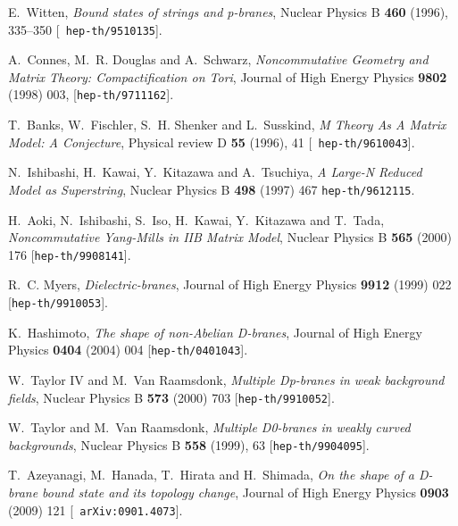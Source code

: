 \documentclass[12pt]{article}
\numberwithin{equation}{section}
\begin{document}
\providecommand{\href}[2]{#2}\begingroup\raggedright\begin{thebibliography}{10}

E.~Witten, {\it {Bound states of strings and p-branes}},  { Nuclear Physics
  B} {\bf 460} (1996), 335--350 [\href{http://arXiv.org/abs/9510135}{{\tt
  hep-th/9510135}}].

A.~Connes, M.~R. Douglas and A.~Schwarz, {\it {Noncommutative Geometry and
  Matrix Theory: Compactification on Tori}},  {Journal of High Energy Physics} 
  {\bf 9802}  (1998) 003,
[\href{http://arXiv.org/abs/9711162}{{\tt hep-th/9711162}}].

T.~Banks, W.~Fischler, S.~H. Shenker and L.~Susskind, {\it {M Theory As A
  Matrix Model: A Conjecture}},  { Physical review D}
  {\bf 55} (1996), 41 [\href{http://arXiv.org/abs/9610043}{{\tt
  hep-th/9610043}}].

N.~Ishibashi, H.~Kawai, Y.~Kitazawa and A.~Tsuchiya, {\it {A Large-N Reduced
  Model as Superstring}},  {Nuclear Physics B} {\bf 498} (1997) 467 \href{http://arXiv.org/abs/9612115}{{\tt hep-th/9612115}}.

{
H.~Aoki, N.~Ishibashi, S.~Iso, H.~Kawai, Y.~Kitazawa and T.~Tada, {\it {Noncommutative Yang-Mills in IIB Matrix Model}}, {Nuclear Physics B} {\bf 565} (2000) 176 [\href{http://arXiv.org/abs/9908141}{{\tt hep-th/9908141}}].}

R.~C. Myers, {\it {Dielectric-branes}},  { Journal of High Energy Physics}
  {\bf 9912} (1999) 022 [\href{http://arXiv.org/abs/9910053}{{\tt hep-th/9910053}}].
  
{
K.~Hashimoto, {\it {The shape of non-Abelian D-branes}}, { Journal of High Energy Physics} {\bf 0404} (2004) 004 [\href{http://arXiv.org/abs/0401043}{{\tt hep-th/0401043}}].}

W.~{Taylor IV} and M.~{Van Raamsdonk}, {\it {Multiple Dp-branes in weak
  background fields}},  { Nuclear Physics B} {\bf 573} (2000) 703
  [\href{http://arXiv.org/abs/9910052}{{\tt hep-th/9910052}}].

W.~Taylor and M.~{Van Raamsdonk}, {\it {Multiple D0-branes in weakly curved
  backgrounds}},  { Nuclear Physics B} {\bf 558} (1999), 63
    [\href{http://arXiv.org/abs/9904095}{{\tt hep-th/9904095}}].

T.~Azeyanagi, M.~Hanada, T.~Hirata and H.~Shimada, {\it {On the shape of a
  D-brane bound state and its topology change}},  { Journal of High Energy
  Physics} {\bf 0903} (2009) 121 [\href{http://arXiv.org/abs/0901.4073}{{\tt
  arXiv:0901.4073}}].


\end{thebibliography}
\end{document}
